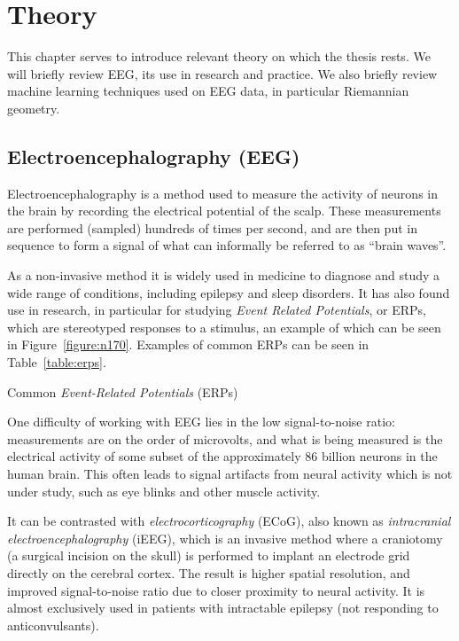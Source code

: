 \chapter{Theory}

This chapter serves to introduce relevant theory on which the thesis rests. We will briefly review EEG, its use in research and practice. We also briefly review machine learning techniques used on EEG data, in particular Riemannian geometry.

\section{Electroencephalography (EEG)}\label{eeg-theory}

    Electroencephalography is a method used to measure the activity of neurons in the brain by recording the electrical potential of the scalp. These measurements are performed (sampled) hundreds of times per second, and are then put in sequence to form a signal of what can informally be referred to as ``brain waves''. 

    As a non-invasive method it is widely used in medicine to diagnose and study a wide range of conditions, including epilepsy and sleep disorders. 
    It has also found use in research, in particular for studying \emph{Event Related Potentials}, or ERPs, which are stereotyped responses to a stimulus, an example of which can be seen in Figure~\ref{figure:n170}. Examples of common ERPs can be seen in Table~\ref{table:erps}.

    \begin{table}
        \centering
        
        \caption{Common \emph{Event-Related Potentials} (ERPs)}\label{table:erps}
    \end{table}

    

    One difficulty of working with EEG lies in the low signal-to-noise ratio: measurements are on the order of microvolts, and what is being measured is the electrical activity of some subset of the approximately 86 billion neurons in the human brain. This often leads to signal artifacts from neural activity which is not under study, such as eye blinks and other muscle activity.

    It can be contrasted with \emph{electrocorticography} (ECoG), also known as \emph{intracranial electroencephalography} (iEEG), which is an invasive method where a craniotomy (a surgical incision on the skull) is performed to implant an electrode grid directly on the cerebral cortex. The result is higher spatial resolution, and improved signal-to-noise ratio due to closer proximity to neural activity. It is almost exclusively used in patients with intractable epilepsy (not responding to anticonvulsants).

